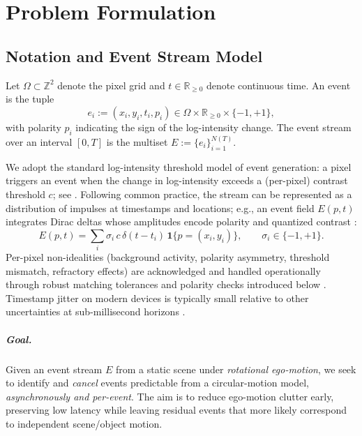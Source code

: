\chapter{Problem Formulation}\label{chap:problem}

\section{Notation and Event Stream Model}
Let $\Omega \subset \mathbb{Z}^2$ denote the pixel grid and $t \in \mathbb{R}_{\ge 0}$ denote continuous time. An event is the tuple
\[
e_i := (x_i, y_i, t_i, p_i) \in \Omega \times \mathbb{R}_{\ge 0} \times \{-1, +1\},
\]
with polarity $p_i$ indicating the sign of the log-intensity change. The event stream over an interval $[0,T]$ is the multiset $E := \{e_i\}_{i=1}^{N(T)}$.

We adopt the standard log-intensity threshold model of event generation: a pixel triggers an event when the change in log-intensity exceeds a (per-pixel) contrast threshold $c$; see \cite{Lichtsteiner2008,Brandli2014,Posch2014,Gallego2020Survey}. Following common practice, the stream can be represented as a distribution of impulses at timestamps and locations; e.g., an event field $E(p,t)$ integrates Dirac deltas whose amplitudes encode polarity and quantized contrast \cite{Scheerlinck2021Thesis,Wang2025Thesis}:
\begin{equation}
E(p,t) = \sum_{i} \sigma_i\,c\,\delta\!\left(t - t_i\right)\,\mathbf{1}\{p=(x_i,y_i)\}, \qquad \sigma_i \in \{-1,+1\}.
\label{eq:event-field}
\end{equation}
Per-pixel non-idealities (background activity, polarity asymmetry, threshold mismatch, refractory effects) are acknowledged and handled operationally through robust matching tolerances and polarity checks introduced below \cite{Brandli2014,Delbruck2020,Gallego2020Survey}. Timestamp jitter on modern devices is typically small relative to other uncertainties at sub-millisecond horizons \cite{Wang2025Thesis}.

\paragraph{Goal.}
Given an event stream $E$ from a static scene under \emph{rotational ego-motion}, we seek to identify and \emph{cancel} events predictable from a circular-motion model, \emph{asynchronously and per-event}. The aim is to reduce ego-motion clutter early, preserving low latency while leaving residual events that more likely correspond to independent scene/object motion.

